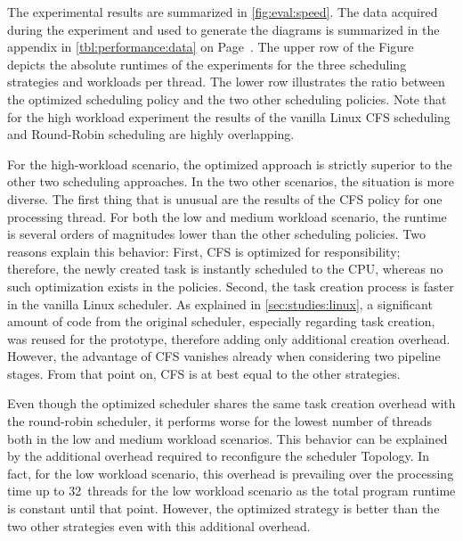 \begin{sidewaysfigure} \centering
	\caption[Results of the performance evaluation.]{Results of the performance evaluation. The upper row shows the absolute runtimes of the experiments, while the lower row illustrates the ratio between the optimized \cobas{} strategy and the two other scheduling policies. Note that for the high workload experiment the results of the vanilla Linux CFS scheduling and \cobas{} Round-Robin scheduling highly overlap.}%
	\label{fig:eval:speed}
\end{sidewaysfigure}

The experimental results are summarized in \cref{fig:eval:speed}. The data acquired during the experiment and used to generate the diagrams is summarized in the appendix in \cref{tbl:performance:data} on Page~\pageref{tbl:performance:data}. The upper row of the Figure depicts the absolute runtimes of the experiments for the three scheduling strategies and workloads per thread. The lower row illustrates the ratio between the optimized scheduling policy and the two other scheduling policies. Note that for the high workload experiment the results of the vanilla Linux \ac{CFS} scheduling and \cobas{} Round-Robin scheduling are highly overlapping.

For the high-workload scenario, the optimized approach is strictly superior to the other two scheduling approaches. In the two other scenarios, the situation is more diverse. The first thing that is unusual are the results of the \ac{CFS} policy for one processing thread. For both the low and medium workload scenario, the runtime is several orders of magnitudes lower than the other scheduling policies. Two reasons explain this behavior: First, \ac{CFS} is optimized for responsibility; therefore, the newly created task is instantly scheduled to the CPU, whereas no such optimization exists in the \cobas{} policies. Second, the task creation process is faster in the vanilla Linux scheduler. As explained in \cref{sec:studies:linux}, a significant amount of code from the original scheduler, especially regarding task creation, was reused for the \cobas{} prototype, therefore adding only additional creation overhead. However, the advantage of \ac{CFS} vanishes already when considering two pipeline stages. From that point on, \ac{CFS} is at best equal to the other strategies.

Even though the optimized \cobas{} scheduler shares the same task creation overhead with the \cobas{} round-robin scheduler, it performs worse for the lowest number of threads both in the low and medium workload scenarios. This behavior can be explained by the additional overhead required to reconfigure the scheduler Topology. In fact, for the low workload scenario, this overhead is prevailing over the processing time up to 32~threads for the low workload scenario as the total program runtime is constant until that point. However, the optimized strategy is better than the two other strategies even with this additional overhead.

